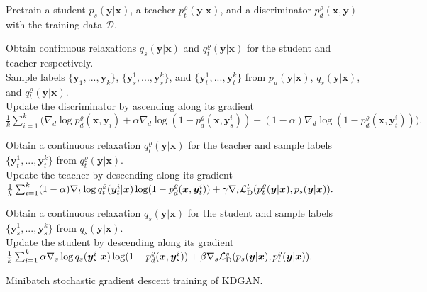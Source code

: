 \documentclass{article}
\newcommand{\OVEC}[1]{\bm{#1}} %
\newcommand{\SVEC}[1]{\bm{#1}} %
\newcommand{\LOSS}[2]{\mathcal{#1}_{\rm{#2}}} %
\newcommand{\stddistloss}{\LOSS{L}{D}^{s}}
\newcommand{\tchdistloss}{\LOSS{L}{D}^{t}}
\newcommand{\fullpdat}{p_{u}(\OVEC{y}|\OVEC{x})}
\newcommand{\fullpstd}[1]{p_{s}(#1|\OVEC{x})}
\newcommand{\fullqstd}[1]{q_{s}(#1|\OVEC{x})}
\newcommand{\fullptch}[1]{p_{t}^{\varrho}(#1|\OVEC{x})}
\newcommand{\fullqtch}[1]{q_{t}^{\varrho}(#1|\OVEC{x})}
\newcommand{\fullpdis}[1]{p_{d}^{\varrho}(\OVEC{x},#1)}
\newcommand{\traindata}{\mathcal{D}}
\begin{document}
\begin{algorithm}[tbp]
\small
\DontPrintSemicolon

Pretrain a student $\fullpstd{\OVEC{y}}$, a teacher $\fullptch{\OVEC{y}}$, and a discriminator $\fullpdis{\OVEC{y}}$ with the training data $\traindata$. \\

 {

 {
Obtain continuous relaxations $\fullqstd{\OVEC{y}}$ and $\fullqtch{\OVEC{y}}$ for the student and teacher respectively. \\
Sample labels $\{\OVEC{y}_{1},...,\OVEC{y}_{k}\}$, $\{\SVEC{y}^{1}_{s},...,\SVEC{y}^{k}_{s}\}$, and $\{\SVEC{y}^{1}_{t},...,\SVEC{y}^{k}_{t}\}$ from $\fullpdat$, $\fullqstd{\OVEC{y}}$, and $\fullqtch{\OVEC{y}}$. \\
Update the discriminator by ascending along its gradient \\
$
\frac{1}{k}
\sum_{i=1}^{k}
\big(
\nabla_{d}
\log\fullpdis{\OVEC{y}_{i}}
+
\alpha\nabla_{d}\log(1-\fullpdis{\SVEC{y}^{i}_{s}})
+
(1-\alpha)\nabla_{d}\log(1-\fullpdis{\SVEC{y}^{i}_{t}})
\big)
\text{.}
$
\\
}

 {
Obtain a continuous relaxation $\fullqtch{\OVEC{y}}$ for the teacher and sample labels $\{\SVEC{y}^{1}_{t},...,\SVEC{y}^{k}_{t}\}$ from $\fullqtch{\OVEC{y}}$. \\
Update the teacher by descending along its gradient \\
$
\frac{1}{k}
\sum_{i=1}^{k}
(1-\alpha)
\nabla_{t}\log\fullqtch{\OVEC{y}^{i}_{t}}
\log(1-\fullpdis{\SVEC{y}^{i}_{t}})
+
\gamma
\nabla_{t}
\tchdistloss(\fullptch{\OVEC{y}},\fullpstd{\OVEC{y}})
\text{.}
$
\\
}

 {
Obtain a continuous relaxation $\fullqstd{\OVEC{y}}$ for the student and sample labels $\{\SVEC{y}^{1}_{s},...,\SVEC{y}^{k}_{s}\}$ from $\fullqstd{\OVEC{y}}$. \\
Update the student by descending along its gradient \\
$
\frac{1}{k}
\sum_{i=1}^{k}
\alpha
\nabla_{s}\log\fullqstd{\OVEC{y}^{i}_{s}}
\log(1-\fullpdis{\SVEC{y}^{i}_{s}})
+
\beta
\nabla_{s}
\stddistloss(\fullpstd{\OVEC{y}},\fullptch{\OVEC{y}})
\text{.}
$
\\
}
}

\caption{ Minibatch stochastic gradient descent training of KDGAN. }
\label{alg:kdgan}
\end{algorithm}
\end{document}
